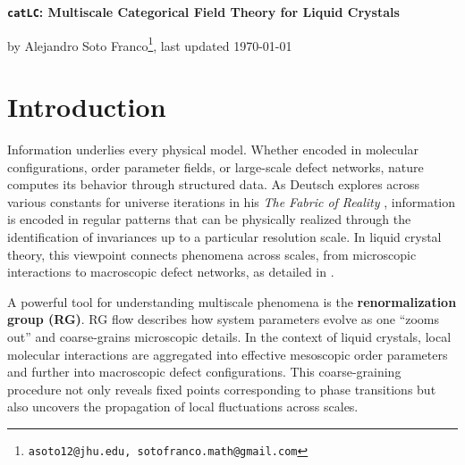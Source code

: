 

	
	\begin{center}
		\begin{huge}
			{\textbf{\texttt{catLC}: Multiscale Categorical Field Theory for Liquid Crystals}}\\[2ex]
		\end{huge}
		
		\begin{Large}
			by Alejandro Soto Franco\footnote{\texttt{asoto12@jhu.edu, sotofranco.math@gmail.com}}, last updated \today
		\end{Large}
	\end{center}
	
	\thispagestyle{empty}
	
	\tableofcontents
	
	\newpage
	
	\section{Introduction}
	
	Information underlies every physical model. Whether encoded in molecular configurations, order parameter fields, or large-scale defect networks, nature computes its behavior through structured data. As Deutsch explores across various constants for universe iterations in his \emph{The Fabric of Reality} \cite{deutsch1997fabric}, information is encoded in regular patterns that can be physically realized through the identification of invariances up to a particular resolution scale. In liquid crystal theory, this viewpoint connects phenomena across scales, from microscopic interactions to macroscopic defect networks, as detailed in \cite{degennes1993physics, cardy1996scaling, ma1976modern}.
	
	A powerful tool for understanding multiscale phenomena is the \textbf{renormalization group (RG)}. RG flow describes how system parameters evolve as one “zooms out” and coarse-grains microscopic details. In the context of liquid crystals, local molecular interactions are aggregated into effective mesoscopic order parameters and further into macroscopic defect configurations. This coarse-graining procedure not only reveals fixed points corresponding to phase transitions but also uncovers the propagation of local fluctuations across scales.
	
